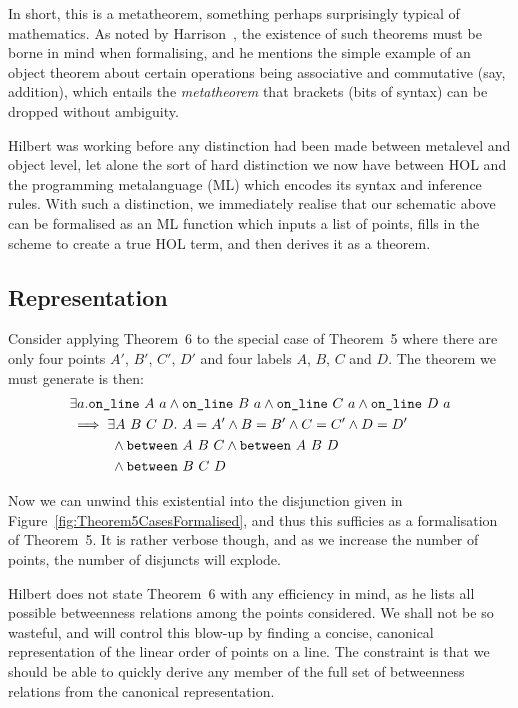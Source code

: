 In short, this is a metatheorem, something perhaps surprisingly typical of mathematics. As noted by Harrison~\cite{FormalizedMathematics}, the existence of such theorems must be borne in mind when formalising, and he mentions the simple example of an object theorem about certain operations being associative and commutative (say, addition), which entails the \emph{metatheorem} that brackets (bits of syntax) can be dropped without ambiguity.

Hilbert was working before any distinction had been made between metalevel and object level, let alone the sort of hard distinction we now have between HOL and the programming metalanguage (ML) which encodes its syntax and inference rules. With such a distinction, we immediately realise that our schematic above can be formalised as an ML function which inputs a list of points, fills in the scheme to create a true HOL term, and then derives it as a theorem.

\subsection{Representation}
Consider applying Theorem~6 to the special case of Theorem~5 where there are only four points $A'$, $B'$, $C'$, $D'$ and four labels $A$, $B$, $C$ and $D$. The theorem we must generate is then:
\begin{equation}
  \begin{split}
    &\exists a. \code{on\_line}\ A\ a\wedge\code{on\_line}\ B\ a\wedge\code{on\_line}\ C\ a\wedge\code{on\_line}\ D\ a\\
    &\implies\exists A\ B\ C\ D.\ A = A' \wedge B = B' \wedge C = C' \wedge D = D'\\
    &\qquad\quad\wedge\between{A}{B}{C} \wedge \between{A}{B}{D}\\
    &\qquad\quad\wedge\between{B}{C}{D}
  \end{split}
\end{equation} 

Now we can unwind this existential into the disjunction given in Figure~\ref{fig:Theorem5CasesFormalised}, and thus this sufficies as a formalisation of Theorem~5. It is rather verbose though, and as we increase the number of points, the number of disjuncts will explode. 

Hilbert does not state Theorem~6 with any efficiency in mind, as he lists all possible betweenness relations among the points considered. We shall not be so wasteful, and will control this blow-up by finding a concise, canonical representation of the linear order of points on a line. The constraint is that we should be able to quickly derive any member of the full set of betweenness relations from the canonical representation.

